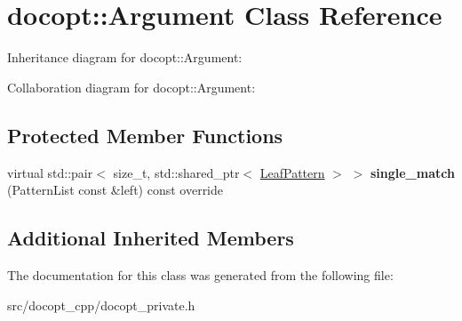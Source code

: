 \hypertarget{classdocopt_1_1Argument}{}\section{docopt\+:\+:Argument Class Reference}
\label{classdocopt_1_1Argument}


Inheritance diagram for docopt\+:\+:Argument\+:


Collaboration diagram for docopt\+:\+:Argument\+:
\subsection*{Protected Member Functions}
\begin{DoxyCompactItemize}
\item 
\mbox{\label{classdocopt_1_1Argument_ab5ebe9ed80895111207a63feeca50f6f}} 
virtual std\+::pair$<$ size\+\_\+t, std\+::shared\+\_\+ptr$<$ \hyperlink{classdocopt_1_1LeafPattern}{Leaf\+Pattern} $>$ $>$ {\bfseries single\+\_\+match} (Pattern\+List const \&left) const override
\end{DoxyCompactItemize}
\subsection*{Additional Inherited Members}


The documentation for this class was generated from the following file\+:\begin{DoxyCompactItemize}
\item 
src/docopt\+\_\+cpp/docopt\+\_\+private.\+h\end{DoxyCompactItemize}
